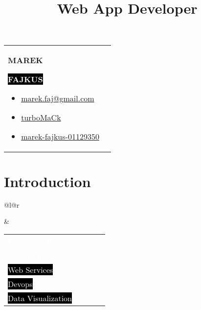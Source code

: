 \documentclass[9pt]{article}
\makeatletter
\def\firstname{Marek}
\def\lastname{Fajkus}
\def\faEmail{{\FAFR \symbol{"F0E0}}} %
\def\faLinkedin{\FAB \symbol{"F08C}} %
\def\faGithub{\FAB \symbol{"F09B}} %
\def\faStarEmpty{\FAFR \symbol{"F005}} %
\def\faStarFull{\FAFS \symbol{"F005}} %
\def\faStarHalf{\FAFS \symbol{"F5C0}} %
\renewcommand{\maketitle}{
  \begin{tabularx}{\textwidth}{@{}l l}
    \begin{minipage}[t]{0.65\textwidth}
      {\Huge \textbf {\MakeUppercase{\firstname}}}

      \vspace{0.2cm}

      \colorbox{black}{
        {\huge \textbf {\textcolor{white}{\MakeUppercase{\lastname}}}}
      }

      \vspace{0.4cm}

      {\LARGE\emph\thetitle}
    \end{minipage}

    \begin{minipage}[t]{0.35\textwidth}
      \vspace{-\baselineskip} %
      \begin{itemize}
        \itemsep0em
      \vspace{-0.5cm}
      \item \href{mailto:marek.faj@gmail.com}{
        \colorbox{ProcessBlue}{\textcolor{white}{\faEmail}} { \textcolor{ProcessBlue}{marek.faj@gmail.com}}
      }
      \item \href{https://github.com/turbomack}{
        \colorbox{black}{\textcolor{white}{\faGithub}} { turboMaCk}
      }
      \item \href{https://www.linkedin.com/in/marek-fajkus-01129350/}{
        \colorbox{black}{\textcolor{white}{\faLinkedin}} { marek-fajkus-01129350}
      }
      \end{itemize}
    \end{minipage}
  \end{tabularx}

  \vspace{0.5cm}
}
\makeatother
\begin{document}
\title{Web App Developer}
\lhead{}
\rhead{}

\thispagestyle{empty}

\maketitle

\section{Introduction}

\begin{tabular}{@{}l@{\hskip 10pt}r}
    \begin{minipage}[l]{0.6\textwidth}
      \blindtext
    \end{minipage}
    &
    \begin{minipage}[r]{0.39\textwidth}
      \setlength\tabcolsep{5pt}
      \begin{tabularx}{\textwidth}{Xr}
          \colorbox{ProcessBlue}{\textcolor{white}{Functional Programming}} &
          \vspace{0.2cm}
          \textcolor{ProcessBlue}{\faStarFull \faStarFull \faStarFull \faStarEmpty \faStarEmpty} \\

          \colorbox{ProcessBlue}{\textcolor{white}{Web Technologies}} &
          \vspace{0.2cm}
          \textcolor{ProcessBlue}{\faStarFull \faStarFull \faStarFull \faStarFull \faStarEmpty} \\

          \colorbox{black}{\textcolor{white}{Web Services}} &
          \vspace{0.2cm}
          \faStarFull \faStarFull \faStarFull \faStarEmpty \faStarEmpty \\

          \colorbox{black}{\textcolor{white}{Devops}} &
          \vspace{0.2cm}
          \faStarFull \faStarFull \faStarHalf \faStarEmpty \faStarEmpty \\

          \colorbox{black}{\textcolor{white}{Data Visualization}} &
          \vspace{0.2cm}
          \faStarFull \faStarFull \faStarFull \faStarEmpty \faStarEmpty \\


\end{tabularx}
\end{minipage}
\end{tabular}
\end{document}
